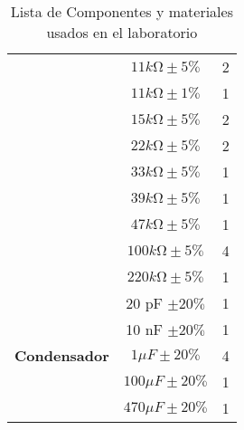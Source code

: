 \begin{table}[H]
\begin{tabular}{|c|c|c|}
                                                            & $11k\si{\ohm}\pm5 \% $  & 2                 \\
                                                            & $11k\si{\ohm}\pm1 \% $  & 1                 \\
                                                            & $15k\si{\ohm}\pm5 \% $  & 2                 \\
                                                            & $22k\si{\ohm}\pm5 \% $  & 2                 \\
                                                            & $33k\si{\ohm}\pm5 \% $  & 1                 \\
                                                            & $39k\si{\ohm}\pm5 \% $  & 1                 \\
                                                            & $47k\si{\ohm}\pm5 \% $  & 1                 \\
                                                            & $100k\si{\ohm}\pm5 \% $ & 4                 \\
                                                            & $220k\si{\ohm}\pm5 \% $ & 1                 \\\hline
        \multirow{5}{5cm}{\centering \textbf{Condensador}}  & 20 pF $\pm 20 \%$       & 1                 \\
                                                            & 10 nF $\pm 20 \%$       & 1                 \\
                                                            & $1\mu F \pm 20 \%$      & 4                 \\
                                                            & $100\mu F \pm 20 \%$    & 1                 \\
                                                            & $470\mu F \pm 20 \%$    & 1                 \\\hline
    \end{tabular}
    \caption{Lista de Componentes y materiales usados en el laboratorio}
    \label{tab:componentes}
\end{table}



\newpage